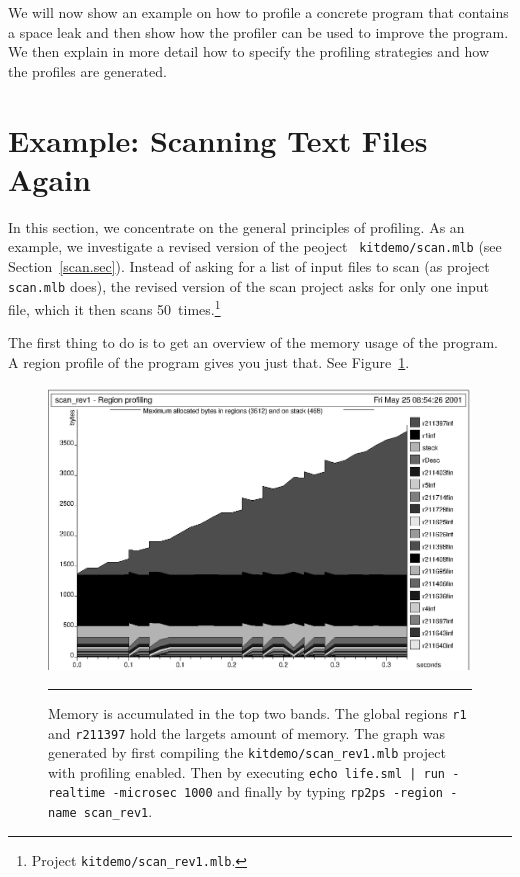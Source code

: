 \documentclass[12pt]{book}
\begin{document}
We will now show an example on how to profile a concrete program that
contains a space leak and then show how the profiler can be used to
improve the program. We then explain in more detail how to specify the
profiling strategies and how the profiles are generated.

\section{Example: Scanning Text Files Again}

In this section, we concentrate on the general principles of
profiling. As an example, we investigate a revised version of the peoject {\tt
  kitdemo/scan.mlb} (see Section~\ref{scan.sec}). Instead of
asking for a list of input files to scan (as project \texttt{scan.mlb}
does), the revised version of the scan project asks for only one input
file, which it then scans
%
50~times.\footnote{Project {\tt kitdemo/scan\_rev1.mlb}.}

The first thing to do is to get an overview of the memory usage of the
program. A region profile of the program gives you just that. See
Figure~\ref{scan_rev1_1.fig}.
\begin{figure}
\begin{center}
  \includegraphics{scan_rev1_1.ps}
\end{center}
\caption{Memory is accumulated in the top two
  bands. The global regions \texttt{r1} and \texttt{r211397} hold the
  largets amount of memory. The graph was generated by first
  compiling the {\tt kitdemo/scan\_rev1.mlb} project with profiling
  enabled. Then by executing \texttt{echo life.sml | run -realtime -microsec 1000} and finally by
  typing \texttt{rp2ps -region -name scan\_rev1}.}
\label{scan_rev1_1.fig}
\medskip\hrule
\end{figure}
\end{document}

